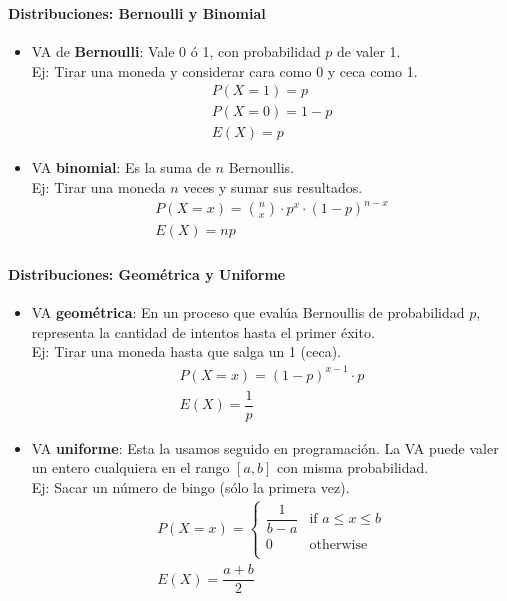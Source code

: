 \documentclass[../main.tex]{subfiles}
\begin{document}
\begin{frame}
  \frametitle{\SECTIONA}
  \framesubtitle{Distribuciones: Bernoulli y Binomial}

  \begin{itemize}
    \item VA de \textbf{Bernoulli}: Vale 0 ó 1, con probabilidad \(p\) de valer 1. \\
      Ej: Tirar una moneda y considerar cara como 0 y ceca como 1.
      \begin{gather*}
        P(X = 1) = p \\
        P(X = 0) = 1 - p \\
        E(X) = p
      \end{gather*}
    \item<2-> VA \textbf{binomial}: Es la suma de \(n\) Bernoullis. \\
      Ej: Tirar una moneda \(n\) veces y sumar sus resultados.
      \begin{gather*}
        P(X = x) = \binom{n}{x} \cdot p^{x} \cdot (1 - p)^{n - x} \\
        E(X) = np
      \end{gather*}
  \end{itemize}
\end{frame}

\begin{frame}
  \frametitle{\SECTIONA}
  \framesubtitle{Distribuciones: Geométrica y Uniforme}

  \begin{itemize}
    \item VA \textbf{geométrica}: En un proceso que evalúa Bernoullis de probabilidad \(p\), representa la cantidad de intentos hasta el primer éxito. \\
      Ej: Tirar una moneda hasta que salga un 1 (ceca).
      \begin{gather*}
        P(X = x) = (1 - p)^{x - 1} \cdot p \\
        E(X) = \dfrac{1}{p}
      \end{gather*}
    \item<2-> VA \textbf{uniforme}: Esta la usamos seguido en programación. La VA puede valer un entero cualquiera en el rango \([a, b]\) con misma probabilidad. \\
      Ej: Sacar un número de bingo (sólo la primera vez).
      \begin{gather*}
        P(X = x) = \begin{cases} \dfrac{1}{b - a} & \text{if } a \leq x \leq b \\ 0 & \text{otherwise} \\ \end{cases} \\
        E(X) = \dfrac{a + b}{2}
      \end{gather*}
  \end{itemize}
\end{frame}
\end{document}
